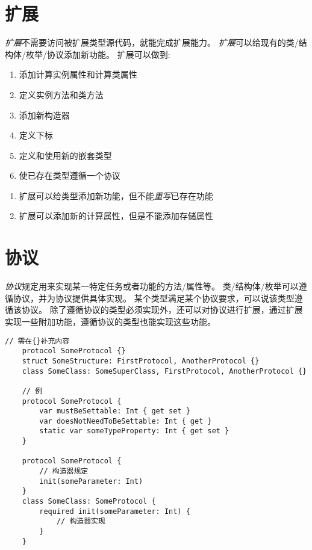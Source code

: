 \documentclass{../main.tex}{subfiles}
\begin{document}
\section{扩展}
\emph{扩展}不需要访问被扩展类型源代码，就能完成扩展能力。
\emph{扩展}可以给现有的类/结构体/枚举/协议添加新功能。
扩展可以做到:
\begin{enumerate}[itemsep=0pt, parsep=0pt, topsep=0pt, partopsep=0pt]
    \item 添加计算实例属性和计算类属性
    \item 定义实例方法和类方法
    \item 添加新构造器
    \item 定义下标
    \item 定义和使用新的嵌套类型
    \item 使已存在类型遵循一个协议
\end{enumerate}
\begin{artCaution}
    \begin{enumerate}[itemsep=0pt, parsep=0pt, topsep=0pt, partopsep=0pt]
        \item 扩展可以给类型添加新功能，但不能\emph{重写}已存在功能
        \item 扩展可以添加新的计算属性，但是不能添加存储属性
    \end{enumerate}
\end{artCaution}





\section{协议}
\emph{协议}规定用来实现某一特定任务或者功能的方法/属性等。
类/结构体/枚举可以遵循协议，并为协议提供具体实现。
某个类型满足某个协议要求，可以说该类型遵循该协议。
除了遵循协议的类型必须实现外，还可以对协议进行扩展，通过扩展实现一些附加功能，遵循协议的类型也能实现这些功能。
\begin{lstlisting}[style = lstCodeStyleSwift, title = {协议基本框架与示例}]
    // 需在{}补充内容
    protocol SomeProtocol {}
    struct SomeStructure: FirstProtocol, AnotherProtocol {}
    class SomeClass: SomeSuperClass, FirstProtocol, AnotherProtocol {}

    // 例
    protocol SomeProtocol {
        var mustBeSettable: Int { get set }
        var doesNotNeedToBeSettable: Int { get }
        static var someTypeProperty: Int { get set }
    }

    protocol SomeProtocol {
        // 构造器规定
        init(someParameter: Int)
    }
    class SomeClass: SomeProtocol {
        required init(someParameter: Int) {
            // 构造器实现
        }
    }
\end{lstlisting}
\end{document}
